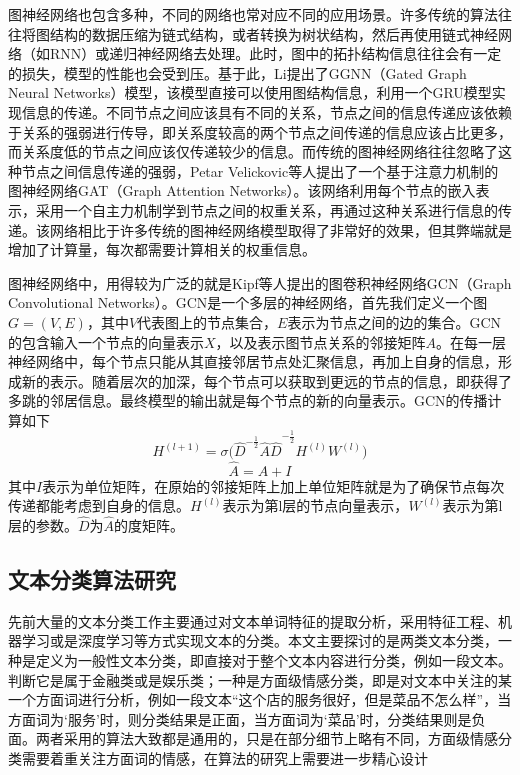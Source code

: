 图神经网络也包含多种，不同的网络也常对应不同的应用场景。许多传统的算法往往将图结构的数据压缩为链式结构，或者转换为树状结构，然后再使用链式神经网络（如RNN）或递归神经网络去处理。此时，图中的拓扑结构信息往往会有一定的损失，模型的性能也会受到压。基于此，Li提出了GGNN（Gated Graph Neural Networks）模型，该模型直接可以使用图结构信息，利用一个GRU模型实现信息的传递。不同节点之间应该具有不同的关系，节点之间的信息传递应该依赖于关系的强弱进行传导，即关系度较高的两个节点之间传递的信息应该占比更多，而关系度低的节点之间应该仅传递较少的信息。而传统的图神经网络往往忽略了这种节点之间信息传递的强弱，Petar Velickovic等人提出了一个基于注意力机制的图神经网络GAT（Graph Attention Networks）。该网络利用每个节点的嵌入表示，采用一个自主力机制学到节点之间的权重关系，再通过这种关系进行信息的传递。该网络相比于许多传统的图神经网络模型取得了非常好的效果，但其弊端就是增加了计算量，每次都需要计算相关的权重信息。

图神经网络中，用得较为广泛的就是Kipf等人提出的图卷积神经网络GCN（Graph Convolutional Networks）。GCN是一个多层的神经网络，首先我们定义一个图$G=\left(V,E\right)$，其中$V$代表图上的节点集合，$E$表示为节点之间的边的集合。GCN的包含输入一个节点的向量表示$X$，以及表示图节点关系的邻接矩阵$A$。在每一层神经网络中，每个节点只能从其直接邻居节点处汇聚信息，再加上自身的信息，形成新的表示。随着层次的加深，每个节点可以获取到更远的节点的信息，即获得了多跳的邻居信息。最终模型的输出就是每个节点的新的向量表示。GCN的传播计算如下
\begin{equation}\label{gcnFormula1}
    H^{\left(l+1\right)}=\sigma{{(\hat{D}}^{-\frac{1}{2}}\hat{A}\hat{D}}^{-\frac{1}{2}}H^{\left(l\right)}W^{\left(l\right)})
\end{equation}
\begin{equation}\label{gcnFormula2}
\hat{A}=A+I
\end{equation}
    其中$I$表示为单位矩阵，在原始的邻接矩阵上加上单位矩阵就是为了确保节点每次传递都能考虑到自身的信息。$H^{\left(l\right)}$表示为第l层的节点向量表示，$W^{\left(l\right)}$表示为第l层的参数。$\hat{D}$为$\hat{A}$的度矩阵。

\subsection{文本分类算法研究}
先前大量的文本分类工作主要通过对文本单词特征的提取分析，采用特征工程、机器学习或是深度学习等方式实现文本的分类。本文主要探讨的是两类文本分类，一种是定义为一般性文本分类，即直接对于整个文本内容进行分类，例如一段文本。判断它是属于金融类或是娱乐类；一种是方面级情感分类，即是对文本中关注的某一个方面词进行分析，例如一段文本“这个店的服务很好，但是菜品不怎么样”，当方面词为‘服务’时，则分类结果是正面，当方面词为‘菜品’时，分类结果则是负面。两者采用的算法大致都是通用的，只是在部分细节上略有不同，方面级情感分类需要着重关注方面词的情感，在算法的研究上需要进一步精心设计

